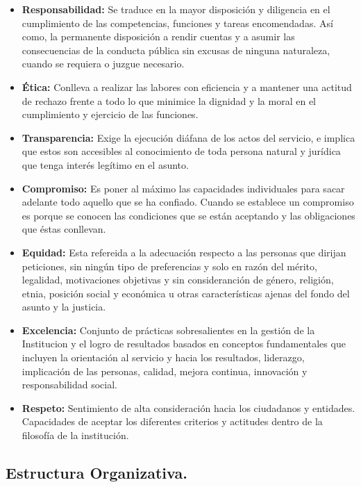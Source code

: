 \documentclass[10pt,]{article}
\providecommand{\tightlist}{%
  \setlength{\itemsep}{0pt}\setlength{\parskip}{0pt}}
\begin{document}
\begin{itemize}
\tightlist
\item
  \textbf{Responsabilidad:} Se traduce en la mayor disposición y
  diligencia en el cumplimiento de las competencias, funciones y tareas
  encomendadas. Así como, la permanente disposición a rendir cuentas y a
  asumir las consecuencias de la conducta pública sin excusas de ninguna
  naturaleza, cuando se requiera o juzgue necesario.
\item
  \textbf{Ética:} Conlleva a realizar las labores con eficiencia y a
  mantener una actitud de rechazo frente a todo lo que minimice la
  dignidad y la moral en el cumplimiento y ejercicio de las funciones.
\item
  \textbf{Transparencia:} Exige la ejecución diáfana de los actos del
  servicio, e implica que estos son accesibles al conocimiento de toda
  persona natural y jurídica que tenga interés legítimo en el asunto.
\item
  \textbf{Compromiso:} Es poner al máximo las capacidades individuales
  para sacar adelante todo aquello que se ha confiado. Cuando se
  establece un compromiso es porque se conocen las condiciones que se
  están aceptando y las obligaciones que éstas conllevan.
\item
  \textbf{Equidad:} Esta refereida a la adecuación respecto a las
  personas que dirijan peticiones, sin ningún tipo de preferencias y
  solo en razón del mérito, legalidad, motivaciones objetivas y sin
  consideranción de género, religión, etnia, posición social y económica
  u otras características ajenas del fondo del asunto y la justicia.
\item
  \textbf{Excelencia:} Conjunto de prácticas sobresalientes en la
  gestión de la Institucion y el logro de resultados basados en
  conceptos fundamentales que incluyen la orientación al servicio y
  hacia los resultados, liderazgo, implicación de las personas, calidad,
  mejora continua, innovación y responsabilidad social.
\item
  \textbf{Respeto:} Sentimiento de alta consideración hacia los
  ciudadanos y entidades. Capacidades de aceptar los diferentes
  criterios y actitudes dentro de la filosofía de la institución.
\end{itemize}

\hypertarget{estructura-organizativa.}{%
\subsection{Estructura Organizativa.}\label{estructura-organizativa.}}
\end{document}
